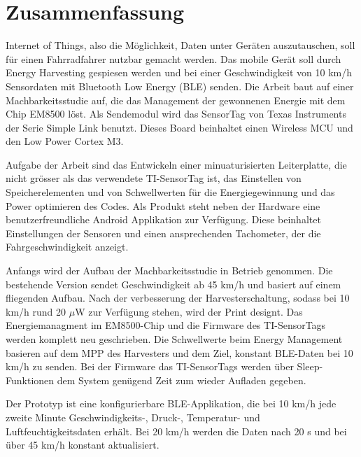\chapter{Zusammenfassung}

Internet of Things, also die Möglichkeit, Daten unter Geräten auszutauschen, soll für einen Fahrradfahrer nutzbar gemacht werden. Das  mobile Gerät soll durch Energy Harvesting gespiesen werden und bei einer Geschwindigkeit von 10 km/h Sensordaten mit Bluetooth Low Energy (BLE) senden. Die Arbeit baut auf einer Machbarkeitsstudie auf, die das Management der gewonnenen Energie mit dem Chip EM8500 löst. Als Sendemodul wird das SensorTag von Texas Instruments der Serie Simple Link benutzt. Dieses Board beinhaltet einen Wireless MCU und den Low Power Cortex M3. 

Aufgabe der Arbeit sind das Entwickeln einer minuaturisierten Leiterplatte, die nicht grösser als das verwendete TI-SensorTag ist, das Einstellen von Speicherelementen und von Schwellwerten für die Energiegewinnung und das Power optimieren des Codes. Als Produkt steht neben der Hardware eine benutzerfreundliche Android Applikation zur Verfügung. Diese beinhaltet Einstellungen der Sensoren und einen ansprechenden Tachometer, der die Fahrgeschwindigkeit anzeigt. 

Anfangs wird der Aufbau der Machbarkeitsstudie in Betrieb genommen. Die bestehende Version sendet Geschwindigkeit ab 45 km/h und basiert auf einem fliegenden Aufbau.
Nach der verbesserung der Harvesterschaltung, sodass bei 10 km/h rund 20 $\mu$W zur Verfügung stehen, wird der Print designt. Das Energiemanagment im EM8500-Chip und die Firmware des TI-SensorTags werden komplett neu geschrieben. Die Schwellwerte beim Energy Management basieren auf dem MPP des Harvesters und dem Ziel, konstant BLE-Daten bei 10 km/h zu senden. Bei der Firmware das TI-SensorTags werden über Sleep-Funktionen dem System genügend Zeit zum wieder Aufladen gegeben. 

Der Prototyp ist eine konfigurierbare BLE-Applikation, die bei 10 km/h jede zweite Minute Geschwindigkeits-, Druck-, Temperatur- und Luftfeuchtigkeitsdaten erhält. Bei 20 km/h werden die Daten nach 20 s und bei über 45 km/h konstant aktualisiert.
